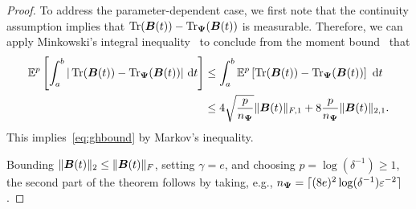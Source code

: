 \begin{proof}

    To address the parameter-dependent case, we first note that the continuity assumption implies that $\operatorname{Tr}(\boldsymbol{B}(t)) - \operatorname{Tr}_{\boldsymbol{\Psi}}(\boldsymbol{B}(t))$ is measurable. Therefore, we can apply Minkowski's integral inequality~\cite[Theorem 202]{hardy-1952-inequalities} to conclude from the moment bound~ that
    \begin{align}
        \mathbb{E}^{p}\left[ \int_{a}^{b} |\operatorname{Tr}(\boldsymbol{B}(t)) - \operatorname{Tr}_{\boldsymbol{\Psi}}(\boldsymbol{B}(t))|~\mathrm{d}t  \right]
        &\leq \int_{a}^{b} \mathbb{E}^{p}\left[ \operatorname{Tr}(\boldsymbol{B}(t)) - \operatorname{Tr}_{\boldsymbol{\Psi}}(\boldsymbol{B}(t)) \right]~\mathrm{d}t \notag \\
        &\leq 4 \sqrt{\frac{p}{n_{\boldsymbol{\Psi}}}} \lVert \boldsymbol{B}(t) \rVert_{F,1} + 8 \frac{p}{n_{\boldsymbol{\Psi}}} \lVert \boldsymbol{B}(t) \rVert_{2,1}.
    \end{align}
    This implies~\eqref{eq:ghbound} by Markov's inequality.

    Bounding $\lVert \boldsymbol{B}(t) \rVert _2 \leq \lVert \boldsymbol{B}(t) \rVert _F$, setting $\gamma = e$, and choosing $p = \log(\delta^{-1}) \geq 1$, the second part of the theorem follows by taking,  e.g., $n_{\boldsymbol{\Psi}} = \lceil (8 e)^2 \log(\delta^{-1}) \varepsilon^{-2} \rceil$.
\end{proof}
